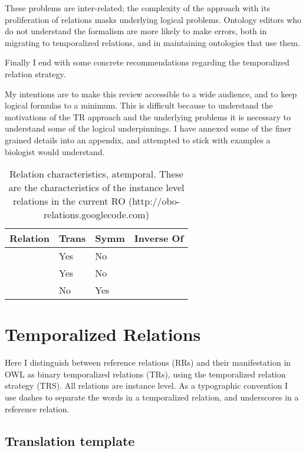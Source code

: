 \documentclass{bioinfo}
\def\partOf{\pr{part\_of}}
\def\hasPart{\pr{has\_part}}
\def\adjacentTo{\pr{adjacent\_to}}
\begin{document}
These problems are inter-related; the complexity of the approach with
its proliferation of relations masks underlying logical
problems. Ontology editors who do not understand the formalism are
more likely to make errors, both in migrating to temporalized
relations, and in maintaining ontologies that use them.

Finally I end with some concrete recommendations regarding the
temporalized relation strategy.

My intentions are to make this review accessible to a wide audience,
and to keep logical formulas to a minimum. This is difficult because
to understand the motivations of the TR approach and the underlying
problems it is necessary to understand some of the logical
underpinnings. I have annexed some of the finer grained details into
an appendix, and attempted to stick with examples a biologist would
understand.

\begin{table}
\begin{tabular}{ | p{2.5cm} | p{1cm} | p{1cm} | p{2.5cm} | }
\hline
\textbf{Relation} & \textbf{Trans} & \textbf{Symm} & \textbf{Inverse Of}  \\
\hline
\partOf\  & Yes & No & \hasPart  \\
\hline
\hasPart\ & Yes & No & \partOf \\
\hline
\adjacentTo\ & No & Yes &  \\
\hline
\end{tabular}
\caption{Relation characteristics, atemporal. These are the characteristics of the instance level relations in the current RO (http://obo-relations.googlecode.com)}
\label{tab:characteristics-atemporal}
\end{table}


\section{Temporalized Relations}

Here I distinguish between reference relations (RRs) and their
manifestation in OWL as binary temporalized relations (TRs), using the
temporalized relation strategy (TRS). All relations are instance
level. As a typographic convention I use dashes to separate the words
in a temporalized relation, and underscores in a reference relation.

\subsection{Translation template}
\end{document}
